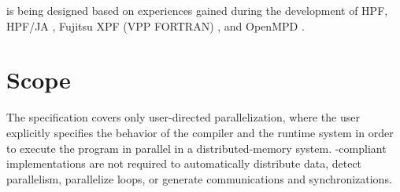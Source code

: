 \begin{itemize}
%
%
%
%
%

\end{itemize}

{\XMP} is being designed based on experiences gained during the
development of HPF, HPF/JA \cite{hpfja}, Fujitsu XPF (VPP
FORTRAN) \cite{XPF,VPPFORTRAN}, and OpenMPD \cite{OpenMPD}.

\section{Scope}

The {\XMP} specification covers only user-directed parallelization,
where the user explicitly specifies the behavior of the compiler and
the runtime system in order to execute the program in parallel in a
distributed-memory system.
%
{\XMP}-compliant implementations are not required to automatically
distribute data, detect parallelism, parallelize loops, or generate
communications and synchronizations.

%

